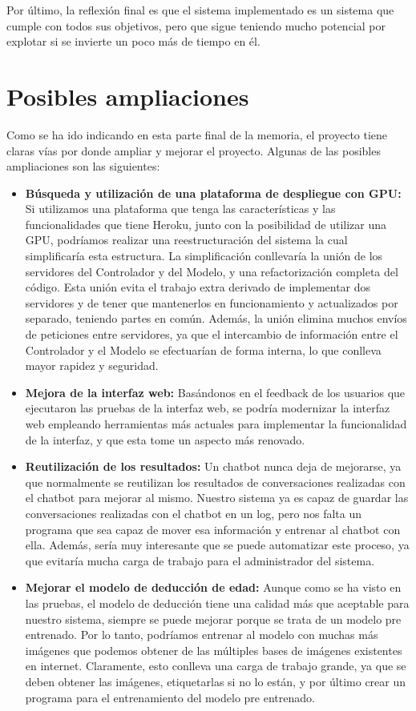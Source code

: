 Por último, la reflexión final es que el sistema implementado es un sistema que cumple con todos sus objetivos, pero que sigue teniendo mucho potencial por explotar si se invierte un poco más de tiempo en él.

\section{Posibles ampliaciones}

Como se ha ido indicando en esta parte final de la memoria, el proyecto tiene claras vías por donde ampliar y mejorar el proyecto. Algunas de las posibles ampliaciones son las siguientes:

\begin{itemize}
\item \textbf{Búsqueda y utilización de una plataforma de despliegue con GPU:} Si utilizamos una plataforma que tenga las características y las funcionalidades que tiene Heroku, junto con la posibilidad de utilizar una GPU, podríamos realizar una reestructuración del sistema la cual simplificaría esta estructura. La simplificación conllevaría la unión de los servidores del Controlador y del Modelo, y una refactorización completa del código. Esta unión evita el trabajo extra derivado de implementar dos servidores y de tener que mantenerlos en funcionamiento y actualizados por separado, teniendo partes en común. Además, la unión elimina muchos envíos de peticiones entre servidores, ya que el intercambio de información entre el Controlador y el Modelo se efectuarían de forma interna, lo que conlleva mayor rapidez y seguridad.
\item \textbf{Mejora de la interfaz web:} Basándonos en el feedback de los usuarios que ejecutaron las pruebas de la interfaz web, se podría modernizar la interfaz web empleando herramientas más actuales para implementar la funcionalidad de la interfaz, y que esta tome un aspecto más renovado.
\item \textbf{Reutilización de los resultados:} Un chatbot nunca deja de mejorarse, ya que normalmente se reutilizan los resultados de conversaciones realizadas con el chatbot para mejorar al mismo. Nuestro sistema ya es capaz de guardar las conversaciones realizadas con el chatbot en un log, pero nos falta un programa que sea capaz de mover esa información y entrenar al chatbot con ella. Además, sería muy interesante que se puede automatizar este proceso, ya que evitaría mucha carga de trabajo para el administrador del sistema.
\item \textbf{Mejorar el modelo de deducción de edad:} Aunque como se ha visto en las pruebas, el modelo de deducción tiene una calidad más que aceptable para nuestro sistema, siempre se puede mejorar porque se trata de un modelo pre entrenado. Por lo tanto, podríamos entrenar al modelo con muchas más imágenes que podemos obtener de las múltiples bases de imágenes existentes en internet. Claramente, esto conlleva una carga de trabajo grande, ya que se deben obtener las imágenes, etiquetarlas si no lo están, y por último crear un programa para el entrenamiento del modelo pre entrenado.

\end{itemize}
